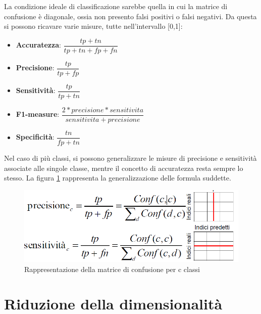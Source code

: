 La condizione ideale di classificazione sarebbe quella in cui la matrice di confusione è diagonale, ossia non presento falsi positivi o falsi negativi. Da questa si possono ricavare varie misure, tutte nell'intervallo [0,1]:
\begin{itemize}
	\item \textbf{Accuratezza}: $\dfrac{tp+tn}{tp+tn+fp+fn}$
	\item \textbf{Precisione}: $\dfrac{tp}{tp+fp}$
	\item \textbf{Sensitività}: $\dfrac{tp}{tp+tn}$
	\item \textbf{F1-measure}: $\dfrac{2*precisione*sensitivita }{sensitivita + precisione}$
	\item \textbf{Specificità}: $\dfrac{tn}{fp+tn}$
\end{itemize}
Nel caso di più classi, si possono generalizzare le misure di precisione e sensitività associate alle singole classe, mentre il concetto di accuratezza resta sempre lo stesso. La figura \ref{immagine_matrice_confusione_cclassi} rappresenta la generalizzazione delle formula suddette.
\begin{figure}[h!]
	\centering
	\includegraphics[scale=0.5]{images/matrice_confusione_cclassi.png}
	\caption{Rappresentazione della matrice di confusione per c classi}
	\label{immagine_matrice_confusione_cclassi}
\end{figure}

\section{Riduzione della dimensionalità}
